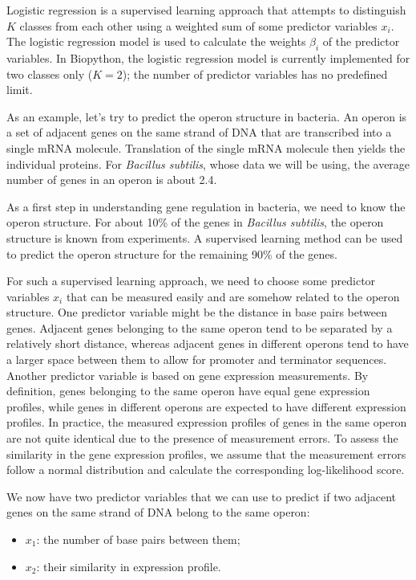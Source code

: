 \documentclass{report}
\begin{document}
Logistic regression is a supervised learning approach that attempts to distinguish $K$ classes from each other using a weighted sum of some predictor variables $x_i$. The logistic regression model is used to calculate the weights $\beta_i$ of the predictor variables. In Biopython, the logistic regression model is currently implemented for two classes only ($K = 2$); the number of predictor variables has no predefined limit.

As an example, let's try to predict the operon structure in bacteria. An operon is a set of adjacent genes on the same strand of DNA that  are transcribed into a single mRNA molecule. Translation of the single mRNA molecule then yields the individual proteins. For {\it Bacillus subtilis}, whose data we will be using, the average number of genes in an operon is about 2.4.

As a first step in understanding gene regulation in bacteria, we need to know the operon structure. For about 10\% of the genes in {\it Bacillus subtilis}, the operon structure is known from experiments. A supervised learning method can be used to predict the operon structure for the remaining 90\% of the genes.

For such a supervised learning approach, we need to choose some predictor variables $x_i$ that can be measured easily and are somehow related to the operon structure. One predictor variable might be the distance in base pairs between genes. Adjacent genes belonging to the same operon tend to be separated by a relatively short distance, whereas adjacent genes in different operons tend to have a larger space between them to allow for promoter and terminator sequences. Another predictor variable is based on gene expression measurements. By definition, genes belonging to the same operon have equal gene expression profiles, while genes in different operons are expected to have different expression profiles. In practice, the measured expression profiles of genes in the same operon are not quite identical due to the presence of measurement errors. To assess the similarity in the gene expression profiles, we assume that the measurement errors follow a normal distribution and calculate the corresponding log-likelihood score.

We now have two predictor variables that we can use to predict if two adjacent genes on the same strand of DNA belong to the same operon:
\begin{itemize}
\item $x_1$: the number of base pairs between them;
\item $x_2$: their similarity in expression profile.
\end{itemize}
\end{document}
